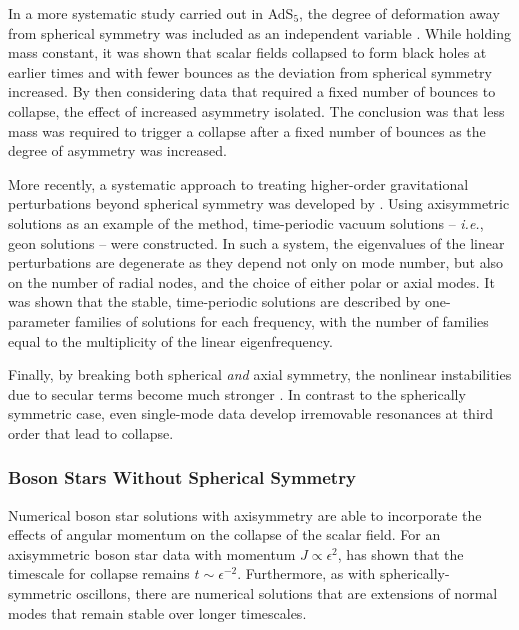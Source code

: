 \documentclass[../PhD.tex]{subfiles}
\begin{document}
In a more systematic study carried out in AdS$_5$, the degree of deformation away from spherical symmetry was included as an independent variable \cite{1706.04199}. While holding mass constant, it was shown that scalar fields collapsed to form black holes at earlier times and with fewer bounces as the deviation from spherical symmetry increased. By then considering data that required a fixed number of bounces to collapse, the effect of increased asymmetry isolated. The conclusion was that less mass was required to trigger a collapse after a fixed number of bounces as the degree of asymmetry was increased.

More recently, a systematic approach to treating higher-order gravitational perturbations beyond spherical symmetry was developed by \cite{1701.07804}. Using axisymmetric solutions as an example of the method, time-periodic vacuum solutions -- {\it i.e.}, geon solutions -- were constructed. In such a system, the eigenvalues of the linear perturbations are degenerate as they depend not only on mode number, but also on the number of radial nodes, and the choice of either polar or axial modes. It was shown that the stable, time-periodic solutions are described by one-parameter families of solutions for each frequency, with the number of families equal to the multiplicity of the linear eigenfrequency.

Finally, by breaking both spherical \emph{and} axial symmetry, the nonlinear instabilities due to secular terms become much stronger \cite{1705.03065}. In contrast to the spherically symmetric case, even single-mode data develop irremovable resonances at third order that lead to collapse.

\subsubsection{Boson Stars Without Spherical Symmetry}

Numerical boson star solutions with axisymmetry are able to incorporate the effects of angular momentum on the collapse of the scalar field. For an axisymmetric boson star data with momentum $J \propto \epsilon^2$, \cite{1706.06101} has shown that the timescale for collapse remains $t \sim \epsilon^{-2}$. Furthermore, as with spherically-symmetric oscillons, there are numerical solutions that are extensions of normal modes that remain stable over longer timescales. 
\end{document}
